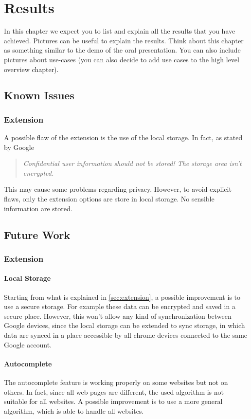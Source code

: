\chapter{Results}
In this chapter we expect you to list and explain all the results that you have achieved. Pictures can be useful to explain the results. Think about this chapter as something similar to the demo of the oral presentation. You can also include pictures about use-cases (you can also decide to add use cases to the high level overview chapter).
\section{Known Issues}

\subsection{Extension}
\label{sec:extension}
A possible flaw of the extension is the use of the local storage. In fact, as stated by Google
\begin{quote}
    \textit{    Confidential user information should not be stored! The storage area isn't encrypted.
    }
\end{quote}
This may cause some problems regarding privacy. However, to avoid explicit flaws, only the extension options are store in local storage. No sensible information are stored.
\section{Future Work}
\label{sec:future_work}

\subsection{Extension}
\subsubsection{Local Storage}
Starting from what is explained in \autoref{sec:extension}, a possible improvement is to use a secure storage. For example these data can be encrypted and saved in a secure place. However, this won't allow any kind of synchronization between Google devices, since the local storage can be extended to sync storage, in which data are synced in a place accessible by all chrome devices connected to the same Google account.

\subsubsection{Autocomplete}
The autocomplete feature is working properly on some websites but not on others. In fact, since all web pages are different, the used algorithm is not suitable for all websites. A possible improvement is to use a more general algorithm, which is able to handle all websites.

